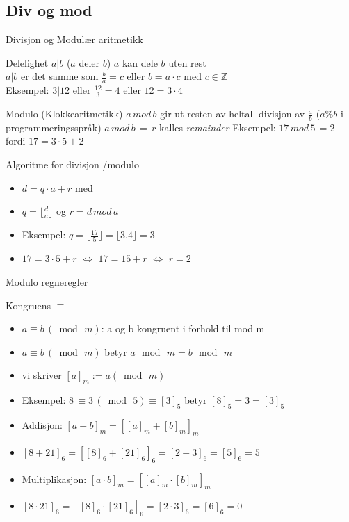 \subsection*{Div og mod}

\begin{frame}{Divisjon og Modulær aritmetikk}
\begin{block}{Delelighet $a|b$ ($a$ deler $b$)}
$a$ kan dele $b$ uten rest\\
$a|b$ er det samme som $\frac{b}{a}=c$ eller $b=a\cdot c$ med $c \in \mathbb{Z}$\\
Eksempel: $3|12$ eller $\frac{12}{3} = 4$ eller $12=3\cdot 4$
\end{block}
\pause
\begin{block}{Modulo (Klokkearitmetikk)}
$a\, mod\, b$ gir ut resten av heltall divisjon av $\frac{a}{b}$ ($a\%b$ i programmeringsspråk)
$a\, mod\, b\, =\, r$ kalles \textit{remainder}
Eksempel: $17\, mod\, 5\, = 2$ fordi $17=3\cdot 5+2$ 
\end{block}
\end{frame}

\begin{frame}[fragile]{Algoritme for divisjon /modulo}
\begin{itemize}[<+->]
\item $d=q\cdot a + r$ med
\item $q=\big\lfloor{\frac{d}{a}}\big\rfloor$ og $r=d\, mod\, a$
\item Eksempel: $q=\big\lfloor{\frac{17}{5}}\big\rfloor = \lfloor{3.4}\rfloor=3$
\item $17=3\cdot 5 + r$ $\iff$ $17=15+r$ $\iff$ $r=2$
\end{itemize}
\end{frame}

\begin{frame}{Modulo regneregler}
\begin{block}{Kongruens $\equiv$}
\begin{itemize}
\item $a \equiv b\, (\bmod \, m)$: a og b kongruent i forhold til mod m
\item $a \equiv b\, (\bmod\, m)$ betyr $a\, \bmod\, m=b\, \bmod\, m$
\item vi skriver $[a]_m := a (\bmod\, m)$
\item Eksempel: $8\, \equiv 3\, (\bmod\, 5) \equiv [3]_5$ betyr $[8]_5=3=[3]_5$ 
\end{itemize}
\end{block}
\pause
\begin{itemize}[<+->]
\item Addisjon: $[a+b]_m = [[a]_m + [b]_m]_m$
\item $[8+21]_6 = [[8]_6 + [21]_6]_6 = [2 + 3]_6 = [5]_6 = 5$
\item Multiplikasjon: $[a\cdot b]_m = [[a]_m \cdot [b]_m]_m$
\item $[8 \cdot 21]_6 = [[8]_6 \cdot [21]_6]_6 = [2 \cdot 3]_6 = [6]_6 = 0$
\end{itemize}
\end{frame}

